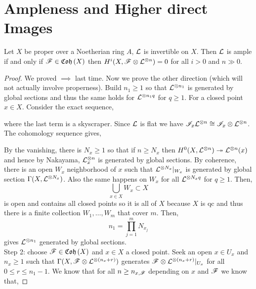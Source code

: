 \documentclass[12pt]{article}
\begin{document}
\section{Ampleness and Higher direct Images}

\begin{thm}[Serre]
Let $X$ be proper over a Noetherian ring $A$, $\mathcal{L}$ is invertible on $X$. Then $\mathcal{L}$ is ample if and only if $\mathscr{F} \in \mathfrak{Coh}\left(X\right)$ then $H^i(X, \mathscr{F} \otimes \mathcal{L}^{\otimes n}) = 0$ for all $i > 0$ and $n \gg 0$.
\end{thm}

\begin{proof}
We proved $\implies$ last time. Now we prove the other direction (which will not actually involve properness). Build $n_1 \ge 1$ so that $\mathcal{L}^{\otimes n_1}$ is generated by global sections and thus the same holds for $\mathcal{L}^{\otimes n_1 q}$ for $q \ge 1$. For a closed point $x \in X$. Consider the exact sequence,
\begin{center}
\end{center}
where the last term is a skyscraper. Since $\mathcal{L}$ is flat we have $\mathscr{I}_x \mathcal{L}^{\otimes n} \cong \mathscr{I}_x \otimes \mathcal{L}^{\otimes n}$. The cohomology sequence gives,
\begin{center}
\end{center}
By the vanishing, there is $N_x \ge 1$ so that if $n \ge N_x$ then $H^0(X, \mathcal{L}^{\otimes n}) \twoheadrightarrow \mathcal{L}^{\otimes n}(x)$ and hence by Nakayama, $\mathcal{L}_x^{\otimes n}$ is generated by global sections. By coherence, there is an open $W_x$ neighborhood of $x$ such that $\mathcal{L}^{\otimes N_x} |_{W_x}$ is generated by global section $\Gamma(X, \mathcal{L}^{\otimes N_x})$. Also the same happens on $W_x$ for all $\mathcal{L}^{\otimes N_x q}$ for $q \ge 1$. Then, 
\[ \bigcup_{x \in X} W_x \subset X \] 
is open and contains all closed points so it is all of $X$ because $X$ is qc and thus there is a finite collection $W_1, \dots, W_m$ that cover $m$. Then,
\[ n_1 = \prod_{j = 1}^m N_{x_j} \]
gives $\mathcal{L}^{\otimes n_1}$ generated by global sections. 
\bigskip\\
Step 2: choose $\mathscr{F} \in \mathfrak{Coh}\left(X\right)$ and $x \in X$ a closed point. Seek an open $x \in U_x$ and $n_x \ge 1$ such that $\Gamma(X, \mathscr{F} \otimes \mathcal{L}^{\otimes (n_x + r)})$ generates $\mathscr{F} \otimes \mathcal{L}^{\otimes (n_x + r)}|_{U_x}$ for all $0 \le r \le n_1 - 1$. We know that for all $n \ge n_{x,\mathscr{F}}$ depending on $x$ and $\mathscr{F}$ we know that,

\end{proof}
\end{document}
